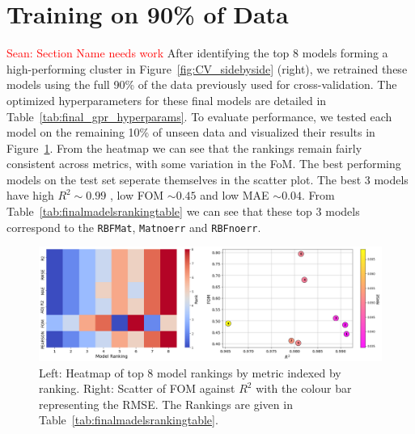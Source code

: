 \documentclass{ucdgradtaughtthesis}
\newcommand{\Sean}[1]{{\textcolor{red}{{Sean: #1}} }}
\begin{document}
\section{Training on 90\% of Data}
\Sean{Section Name needs work}
After identifying the top 8 models forming a high-performing cluster in Figure~\ref{fig:CV_sidebyside} (right),
we retrained these models using the full 90\% of the data previously used for cross-validation. The optimized hyperparameters for these final models are detailed in Table~\ref{tab:final_gpr_hyperparams}. 
To evaluate performance, we tested each model on the remaining 10\% of unseen data and visualized their results in Figure~\ref{fig:comparing_metrics}.
From the heatmap we can see that the rankings remain fairly consistent across metrics, with some variation in the FoM. The best performing models on the test set seperate themselves in the scatter plot. The best 3 models have high \(R^2 \sim 0.99\) , low FOM \(\sim 0.45\) and low MAE \(\sim 0.04\).
From Table~\ref{tab:finalmadelsrankingtable} we can see that these top 3 models correspond to the \texttt{RBFMat}, \texttt{Matnoerr} and \texttt{RBFnoerr}.
\begin{figure}[H]
    \centering
    \includegraphics[width=\textwidth]{LatexPlots/final_gps_plots/metric_of_finalists_comparison.png}
    \caption[Visualising the ranking of each model on the test data.]{Left: Heatmap of top 8 model rankings by metric indexed by ranking.
    Right: Scatter of FOM against \(R^2\) with the colour bar representing the RMSE.
    The Rankings are given in Table~\ref{tab:finalmadelsrankingtable}.}
    \label{fig:comparing_metrics}
\end{figure}
\end{document}
